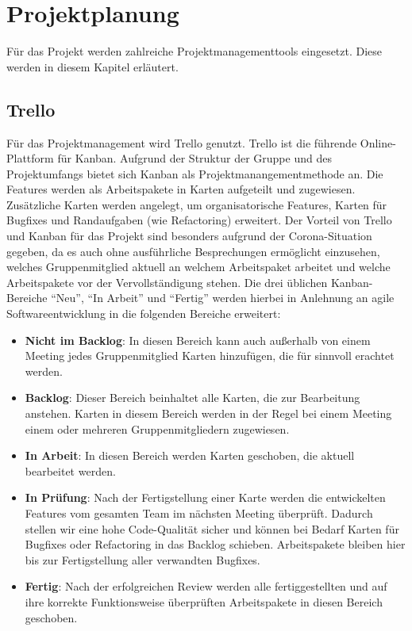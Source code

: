 \section{Projektplanung}
Für das Projekt werden zahlreiche Projektmanagementtools eingesetzt.
Diese werden in diesem Kapitel erläutert.
\subsection*{Trello}
Für das Projektmanagement wird Trello genutzt.
Trello ist die führende Online-Plattform für Kanban.%
Aufgrund der Struktur der Gruppe und des Projektumfangs bietet sich Kanban als Projektmanangementmethode an.
Die Features werden als Arbeitspakete in Karten aufgeteilt und zugewiesen.
Zusätzliche Karten werden angelegt, um organisatorische Features, Karten für Bugfixes und Randaufgaben (wie Refactoring) erweitert.
Der Vorteil von Trello und Kanban für das Projekt sind besonders aufgrund der Corona-Situation gegeben, da es auch ohne ausführliche Besprechungen ermöglicht einzusehen, welches Gruppenmitglied aktuell an welchem Arbeitspaket arbeitet und welche Arbeitspakete vor der Vervollständigung stehen.
Die drei üblichen Kanban-Bereiche \enquote{Neu}, \enquote{In Arbeit} und \enquote{Fertig} werden hierbei in Anlehnung an agile Softwareentwicklung in die folgenden Bereiche erweitert:
\begin{itemize}
    \item \textbf{Nicht im Backlog}: In diesen Bereich kann auch außerhalb von einem Meeting jedes Gruppenmitglied Karten hinzufügen, die für sinnvoll erachtet werden.
    \item \textbf{Backlog}: Dieser Bereich beinhaltet alle Karten, die zur Bearbeitung anstehen. Karten in diesem Bereich werden in der Regel bei einem Meeting einem oder mehreren Gruppenmitgliedern zugewiesen.%
    \item \textbf{In Arbeit}: In diesen Bereich werden Karten geschoben, die aktuell bearbeitet werden.%
    \item \textbf{In Prüfung}: Nach der Fertigstellung einer Karte werden die entwickelten Features vom gesamten Team im nächsten Meeting überprüft. Dadurch stellen wir eine hohe Code-Qualität sicher und können bei Bedarf Karten für Bugfixes oder Refactoring in das Backlog schieben. Arbeitspakete bleiben hier bis zur Fertigstellung aller verwandten Bugfixes.%
    \item \textbf{Fertig}: Nach der erfolgreichen Review werden alle fertiggestellten und auf ihre korrekte Funktionsweise überprüften Arbeitspakete in diesen Bereich geschoben.
\end{itemize}
